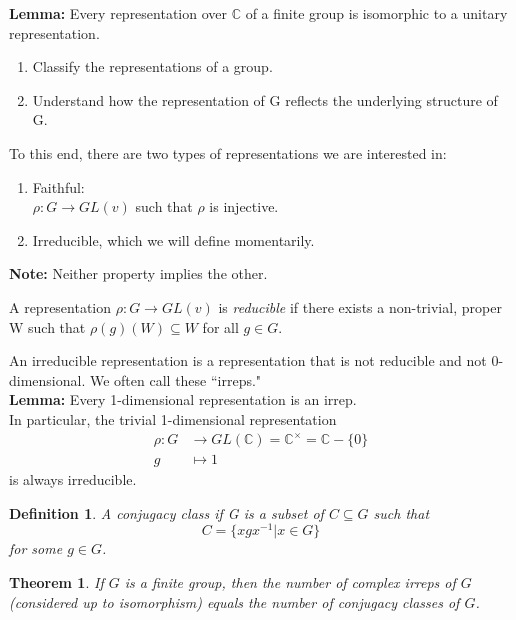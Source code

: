 \documentclass{article}
\newtheorem{thm}{Theorem}
\newtheorem*{dfn}{Definition}
\begin{document}
\textbf{Lemma:} Every representation over $\mathbb{C}$ of a finite group is isomorphic to a unitary representation. \\


\begin{enumerate}
	\item Classify the representations of a group.
	\item Understand how the representation of G reflects the underlying structure of G.
	
\end{enumerate}

To this end, there are two types of representations we are interested in:

\begin{enumerate}
	\item Faithful:\\ $\rho : G \to GL(v)$ such that $\rho$ is injective.
	\item Irreducible, which we will define momentarily.
	
\end{enumerate}

\textbf{Note:} Neither property implies the other.

A representation $\rho: G \to GL(v)$ is \emph{reducible} if there exists a non-trivial, proper W such that $\rho(g)(W) \subseteq W$ for all $g \in G$. 

An irreducible representation is a representation that is not reducible and not 0-dimensional.  We often call these ``irreps." \\

\textbf{Lemma:} Every 1-dimensional representation is an irrep.\\

In particular, the trivial 1-dimensional representation
\[\begin{aligned}
\rho: G &\to GL(\mathbb{C}) = \mathbb{C}^\times = \mathbb{C} - \{0\} \\
g &\mapsto 1
\end{aligned}\]
is always irreducible.

\begin{dfn}
    A conjugacy class if G is a subset of $C \subseteq G$ such that 
    $$C = \{xgx^{-1} | x \in G\}$$
for some $g \in G$.
\end{dfn}

\begin{thm}
    If $G$ is a finite group, then the number of complex irreps of $G$ (considered up to isomorphism) equals the number of conjugacy classes of $G$.
\end{thm}
\end{document}
